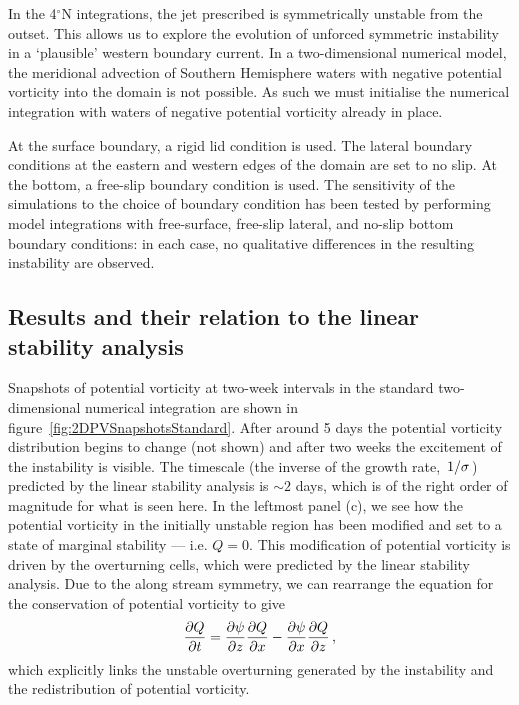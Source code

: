 In the 4$^\circ$N integrations, the jet prescribed is symmetrically unstable from the outset. This allows us to explore the evolution of unforced symmetric instability in a `plausible' western boundary current. In a two-dimensional numerical model, the meridional advection of Southern Hemisphere waters with negative potential vorticity into the domain is not possible. As such we must initialise the numerical integration with waters of negative potential vorticity already in place.

At the surface boundary, a rigid lid condition is used. The lateral boundary conditions at the eastern and western edges of the domain are set to no slip. At the bottom, a free-slip boundary condition is used. The sensitivity of the simulations to the choice of boundary condition has been tested by performing model integrations with free-surface, free-slip lateral, and no-slip bottom boundary conditions: in each case, no qualitative differences in the resulting instability are observed.

\subsection{Results and their relation to the linear stability analysis}
Snapshots of potential vorticity at two-week intervals in the standard two-dimensional numerical integration are shown in figure~\ref{fig:2DPVSnapshotsStandard}. After around 5 days the potential vorticity distribution begins to change (not shown) and after two weeks the excitement of the instability is visible. The timescale (the inverse of the growth rate, $\flatfrac{1}{\sigma}$) predicted by the linear stability analysis is $\sim 2$ days, which is of the right order of magnitude for what is seen here. In the leftmost panel (c), we see how the potential vorticity in the initially unstable region has been modified and set to a state of marginal stability --- i.e. $Q = 0$. This modification of potential vorticity is driven by the overturning cells, which were predicted by the linear stability analysis. Due to the along stream symmetry, we can rearrange the equation for the conservation of potential vorticity to give
\begin{equation}
    \label{eq:PVEvolution}
    \pdv{Q}{t} = \pdv{\psi}{z}\pdv{Q}{x} - \pdv{\psi}{x}\pdv{Q}{z} \, ,%
\end{equation}
which explicitly links the unstable overturning generated by the instability and the redistribution of potential vorticity\footnotemark.

